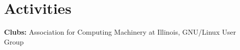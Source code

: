 \documentclass{article}
\makeatletter
\newcommand{\resumeItem}[1]{
  \item\small{
    {#1 \vspace{-2pt}}
  }
}
\newcommand{\resumeProjectHeading}[2]{
    \item
    \begin{tabular*}{0.97\textwidth}{l@{\extracolsep{\fill}}r}
      \small#1 & #2 \\
    \end{tabular*}\vspace{-7pt}
}
\newcommand{\resumeSubHeadingListStart}{\begin{itemize}[leftmargin=0.15in, label={}]}
\newcommand{\resumeSubHeadingListEnd}{\end{itemize}}
\newcommand{\resumeItemListStart}{\begin{itemize}}
\newcommand{\resumeItemListEnd}{\end{itemize}\vspace{-5pt}}
\makeatother
\begin{document}
\section{Activities}
\begin{itemize}[leftmargin=0.15in, label={}]
	\small{\item{
      \textbf{Clubs: }{Association for Computing Machinery at Illinois, GNU/Linux User Group}\\

		      }}
\end{itemize}
\vspace{-10pt}
\begin{comment}

\section{Miscellaneous}
\begin{itemize}[leftmargin=0.15in, label={}]
	\small{\item{

		            \textbf{High School Clubs: }{Speech and Debate (President), Science Fair (President)} \\

		            \textbf{High School Awards: }{2x State Championship Policy Debate, NMSQT Finalist, Broadcom MASTERS Top 300, Premier Distinction NSDA Honor Society, Presidential Volunteer Service Bronze Award, Presidential Volunteer Service Gold Award}\\
		     }}
\end{itemize}

\section{High School Awards}
\resumeSubHeadingListStart
\resumeSubHeadingListStart
\resumeProjectHeading
{\textbf{Kumon} $|$ \footnotesize\emph{Assistant for Center Operation - Fox Chapel Center}}{2021 - 2024}
\resumeItemListStart
\resumeItem{Successfully improved the self-initiated learning abilities of over 200 students (Pre K-9) in English \& math
	(arithmetic-calculus)}
\resumeItem{Graded students' daily work and tutored students through concepts.}
\resumeItemListEnd
\resumeSubHeadingListEnd
\resumeProjectHeading
{\textbf{Pennsylvania Junior Academy of Science Regional and State First Place}}{2021 - 2023}


\end{comment}
\end{document}
